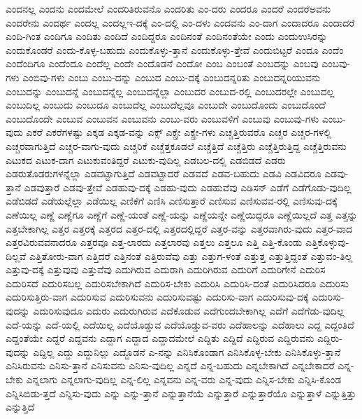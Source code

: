 {ಎಂದನಲ್ಲ
ಎಂದನು
ಎಂದಮೇಲೆ
ಎಂದರಿತಿರುವನೊ
ಎಂದರಿತು
ಎಂ-ದರು
ಎಂದರೂ
ಎಂದರೆ
ಎಂದರೆಅವನು
ಎಂದರೇನು
ಎಂದರ್ಥ
ಎಂದಲ್ಲ
ಎಂದಲ್ಲಇ-ದಕ್ಕೆ
ಎಂ-ದಲ್ಲಿ
ಎಂ-ದಳು
ಎಂದವನು
ಎಂ-ದಾಗ
ಎಂದಾದರೂ
ಎಂದಾದರೆ
ಎಂದಿ-ಗಿಂತ
ಎಂದಿಗೂ
ಎಂದಿತು
ಎಂದಿದೆ
ಎಂದಿದ್ದರೂ
ಎಂದಿನಂತೆ
ಎಂದಿನಂತೆಯೇ
ಎಂದು
ಎಂದುಉಸಿರನ್ನು
ಎಂದುಕೊಂಡರೆ
ಎಂದು-ಕೊಳ್ಳ-ಬಹುದು
ಎಂದುಕೊಳ್ಳು-ತ್ತಾನೆ
ಎಂದುಕೊಳ್ಳು-ತ್ತೇವೆ
ಎಂದುಬಿಟ್ಟರೆ
ಎಂದೂ
ಎಂದೆಂ
ಎಂದೆಂದಿಗೂ
ಎಂದೆಂದೂ
ಎಂದೆಲ್ಲ
ಎಂದೇ
ಎಂದೊಡನೆ
ಎಂದೋ
ಎಂಬ
ಎಂಬಂತೆ
ಎಂಬದನ್ನು
ಎಂಬವು
ಎಂಬವು-ಗಳು
ಎಂಬಿವು-ಗಳು
ಎಂಬು
ಎಂಬು-ದನ್ನು
ಎಂಬುದ
ಎಂಬು-ದಕ್ಕೆ
ಎಂಬುದನ್ನರಿತು
ಎಂಬುದನ್ನರಿಯುವನು
ಎಂಬುದನ್ನು
ಎಂಬುದನ್ನೆ
ಎಂಬುದನ್ನೆಲ್ಲ
ಎಂಬುದನ್ನೆಲ್ಲಾ
ಎಂಬುದರ
ಎಂಬುದ-ರಲ್ಲಿ
ಎಂಬುದರಲ್ಲೇ
ಎಂಬುದಲ್ಲ
ಎಂಬುದಿಲ್ಲ
ಎಂಬುದು
ಎಂಬುದೂ
ಎಂಬುದೆಲ್ಲ
ಎಂಬುದೆಲ್ಲವೂ
ಎಂಬುದೇ
ಎಂಬುದೊಂದು
ಎಂಬುದೊಂದೆ
ಎಂಬುದೊಂದೇ
ಎಂಬುವ
ಎಂಬುವನ
ಎಂಬುವನು
ಎಂಬು-ವರು
ಎಂಬುವಳಿಗೆ
ಎಂಬುವು
ಎಂಬುವು-ಗಳು
ಎಂಬು-ವುದು
ಎಕರೆ
ಎಕರೆಗಳಷ್ಟು
ಎಕ್ಕಡ
ಎಕ್ಕಡ-ವನ್ನು
ಎಕ್ಸ್
ಎಕ್ಸ್ರೇ
ಎಕ್ಸ್ರೇ-ಗಳು
ಎಚ್ಚತ್ತಿರುವರೊ
ಎಚ್ಚರ
ಎಚ್ಚರ-ಗಳಲ್ಲಿ
ಎಚ್ಚರವಾಗುತ್ತಿದೆ
ಎಚ್ಚರ-ವಾಗು-ವುದು
ಎಚ್ಚರಿಕೆ
ಎಚ್ಚೆತ್ತಕೂಡಲೆ
ಎಚ್ಚೆತ್ತಿದೆ
ಎಚ್ಚೆತ್ತಿರು
ಎಚ್ಚೆತ್ತಿರುತ್ತಿದ್ದ
ಎಚ್ಚೆತ್ತಿರುವನು
ಎಟುಕದ
ಎಟುಕ-ದಾಗ
ಎಟುಕುವಂತಿದ್ದರೆ
ಎಟುಕು-ವುದಿಲ್ಲ
ಎಡಬಲ-ದಲ್ಲಿ
ಎಡಬಿಡದೆ
ಎಡರು
ಎಡರುತೊಡರುಗಳನ್ನೆಲ್ಲಾ
ಎಡವಟ್ಟಾಗುತ್ತಿದೆ
ಎಡವಟ್ಟಾದರೆ
ಎಡವದೆ
ಎಡವ-ಬಹುದು
ಎಡವಿ
ಎಡವಿದರೂ
ಎಡವು-ತ್ತಾನೆ
ಎಡವುತ್ತಾರೆ
ಎಡವು-ತ್ತೇವೆ
ಎಡಹುವು-ದಕ್ಕೆ
ಎಡಹು-ವುದು
ಎಡಹುವೆವು
ಎಡಿಸನ್
ಎಡೆಗೆ
ಎಡೆಗೊಡು-ವುದಿಲ್ಲ
ಎಡೆಬಿಡದೆ
ಎಡೆಯಲ್ಲೆಲ್ಲಾ
ಎಡೆಯಿಲ್ಲ
ಎಣಿಕೆಗೆ
ಎಣಿಸಿ
ಎಣಿಸುತ್ತಾರೆ
ಎಣಿಸುವ
ಎಣಿಸುವವ-ರಲ್ಲಿ
ಎಣಿಸುವು-ದಕ್ಕೆ
ಎಣೆಯಿಲ್ಲ
ಎಣ್ಣೆ
ಎಣ್ಣೆಗೂ
ಎಣ್ಣೆಗೆ
ಎಣ್ಣೆ-ಯಂತೆ
ಎಣ್ಣೆ-ಯನ್ನು
ಎಣ್ಣೆಯನ್ನೇ
ಎಣ್ಣೆಯಿದ್ದರೂ
ಎಣ್ಣೆಯಿಲ್ಲದೆ
ಎತ್ತ
ಎತ್ತನ್ನು
ಎತ್ತಬೇಕಾಗಿಲ್ಲ
ಎತ್ತರ
ಎತ್ತರಕ್ಕೆ
ಎತ್ತರದ
ಎತ್ತರ-ದಲ್ಲಿ
ಎತ್ತರದಲ್ಲಿದ್ದರೆ
ಎತ್ತರ-ವನ್ನು
ಎತ್ತರವಾಗಿರು-ವುದು
ಎತ್ತರ-ವಾದ
ಎತ್ತರವಿರುವವನಾದರೂ
ಎತ್ತರವೂ
ಎತ್ತ-ಲಾರದು
ಎತ್ತಲಾರವು
ಎತ್ತಲು
ಎತ್ತಲೂ
ಎತ್ತಿ
ಎತ್ತಿ-ಕೊಂಡು
ಎತ್ತಿಕೊಳ್ಳುವು-ದಿಲ್ಲವೆ
ಎತ್ತಿತೋರು-ವಾಗ
ಎತ್ತಿದರೆ
ಎತ್ತಿನಂತೆ
ಎತ್ತಿರುವೆವು
ಎತ್ತು
ಎತ್ತುಗ-ಳಂತೆ
ಎತ್ತುತ್ತ
ಎತ್ತುತ್ತಿದ್ದಂತೆ
ಎತ್ತುವಂ-ತಿಲ್ಲ
ಎತ್ತುವು-ದಕ್ಕೆ
ಎತ್ತುವುವು
ಎತ್ತುವೆವು
ಎದುಗಿರುವ
ಎದುರಾಗಿ
ಎದುರಿಗಿರುವ
ಎದುರಿಗೆ
ಎದುರಿಗೇನೆ
ಎದುರಿಸ
ಎದುರಿಸದೆ
ಎದುರಿಸಬಲ್ಲ
ಎದುರಿಸಬೇಕಾಗಿದೆ
ಎದುರಿಸ-ಬೇಕು
ಎದುರಿಸಿ
ಎದುರಿಸಿ-ದಂತೆ
ಎದುರಿಸಿದರೂ
ಎದುರಿಸು
ಎದುರಿಸುತ್ತಿರು-ವಾಗ
ಎದುರಿಸುವ
ಎದುರಿಸುವನು
ಎದುರಿಸುವಷ್ಟು
ಎದುರಿಸು-ವಾಗ
ಎದುರಿಸುವು-ದಕ್ಕೆ
ಎದುರಿಸು-ವುದನ್ನು
ಎದುರಿಸುವುದೂ
ಎದುರು
ಎದುರುಗಿರುವ
ಎದೆಕೊಡುವ
ಎದೆಗುಂದಬೇಕಾಗಿಲ್ಲ
ಎದೆಗೆ
ಎದೆಗೆಡು-ವುದಿಲ್ಲ
ಎದೆ-ಯನ್ನು
ಎದೆ-ಯಲ್ಲಿ
ಎದೆಯಿಲ್ಲ
ಎದೆಯೊಡ್ಡುವ
ಎದೆಯೊಡ್ಡುವ-ವರು
ಎದೆಹಾಲನ್ನು
ಎದೆಹಾಲು
ಎದ್ದ
ಎದ್ದಂತಿದೆ
ಎದ್ದಂತೆಯೇ
ಎದ್ದರೆ
ಎದ್ದವನು
ಎದ್ದಾಗ
ಎದ್ದಾದ
ಎದ್ದಾದಮೇಲೆ
ಎದ್ದಿತು
ಎದ್ದಿದೆ
ಎದ್ದಿರುವ
ಎದ್ದಿರುವನು
ಎದ್ದಿರು-ವುದನ್ನು
ಎದ್ದಿಲ್ಲ
ಎದ್ದು
ಎದ್ದುನಿಲ್ಲು
ಎದ್ದೊಡನೆ
ಎ-ನನ್ನು
ಎನಿಸಿಕೊಂಡಾಗ
ಎನಿಸಿಕೊಳ್ಳ-ಬೇಕು
ಎನಿಸಿಕೊಳ್ಳು-ತ್ತಾನೆ
ಎನಿಸಿರುವನು
ಎನಿಸು-ತ್ತಾನೆ
ಎನಿಸುವನು
ಎನಿಸು-ವುದಿಲ್ಲ
ಎನ್ನದೆ
ಎನ್ನ-ಬಹುದು
ಎನ್ನಬೇಕಾಗಿದೆ
ಎನ್ನಬೇಕಾದರೆ
ಎನ್ನ-ಬೇಕು
ಎನ್ನಲಾಗು
ಎನ್ನಲಾಗು-ವುದಿಲ್ಲ
ಎನ್ನ-ಲಿಲ್ಲ
ಎನ್ನವನು
ಎನ್ನ-ವರು
ಎನ್ನ-ವುದು
ಎನ್ನಿಸ-ಬೇಕು
ಎನ್ನಿಸಿ-ಕೊಂಡ
ಎನ್ನಿಸಿಬಿಡು-ತ್ತದೆ
ಎನ್ನಿಸು-ವುದು
ಎನ್ನು
ಎನ್ನು-ತ್ತಾನೆ
ಎನ್ನುತ್ತಾನೆಯೆ
ಎನ್ನುತ್ತಾರೆ
ಎನ್ನುತ್ತಾರೆಯೊ
ಎನ್ನುತ್ತಾಳೆ
ಎನ್ನುತ್ತಿತ್ತು
ಎನ್ನುತ್ತಿದೆ
}
